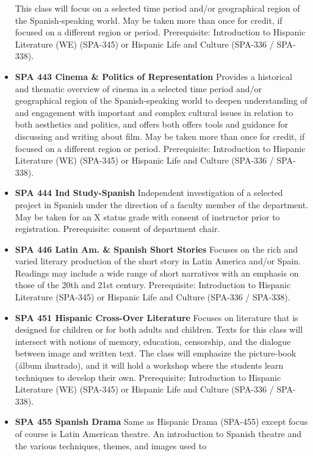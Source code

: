 \documentclass[
  letterpaper,
]{scrbook}
\begin{document}
\begin{itemize}
  This class will focus on a selected time period and/or geographical
  region of the Spanish-speaking world. May be taken more than once for
  credit, if focused on a different region or period. Prerequisite:
  Introduction to Hispanic Literature (WE) (SPA-345) or Hispanic Life
  and Culture (SPA-336 / SPA-338).
\item
  \textbf{SPA 443 Cinema \& Politics of Representation} Provides a
  historical and thematic overview of cinema in a selected time period
  and/or geographical region of the Spanish-speaking world to deepen
  understanding of and engagement with important and complex cultural
  issues in relation to both aesthetics and politics, and offers both
  offers tools and guidance for discussing and writing about film. May
  be taken more than once for credit, if focused on a different region
  or period. Prerequisite: Introduction to Hispanic Literature (WE)
  (SPA-345) or Hispanic Life and Culture (SPA-336 / SPA-338).\\
\item
  \textbf{SPA 444 Ind Study-Spanish} Independent investigation of a
  selected project in Spanish under the direction of a faculty member of
  the department. May be taken for an X status grade with consent of
  instructor prior to registration. Prerequisite: consent of department
  chair.
\item
  \textbf{SPA 446 Latin Am. \& Spanish Short Stories} Focuses on the
  rich and varied literary production of the short story in Latin
  America and/or Spain. Readings may include a wide range of short
  narratives with an emphasis on those of the 20th and 21st century.
  Prerequisite: Introduction to Hispanic Literature (SPA-345) or
  Hispanic Life and Culture (SPA-336 / SPA-338).
\item
  \textbf{SPA 451 Hispanic Cross-Over Literature} Focuses on literature
  that is designed for children or for both adults and children. Texts
  for this class will intersect with notions of memory, education,
  censorship, and the dialogue between image and written text. The class
  will emphasize the picture-book (álbum ilustrado), and it will hold a
  workshop where the students learn techniques to develop their own.
  Prerequisite: Introduction to Hispanic Literature (WE) (SPA-345) or
  Hispanic Life and Culture (SPA-336 / SPA-338).
\item
  \textbf{SPA 455 Spanish Drama} Same as Hispanic Drama (SPA-455) except
  focus of course is Latin American theatre. An introduction to Spanish
  theatre and the various techniques, themes, and images used to

\end{itemize}
\end{document}
